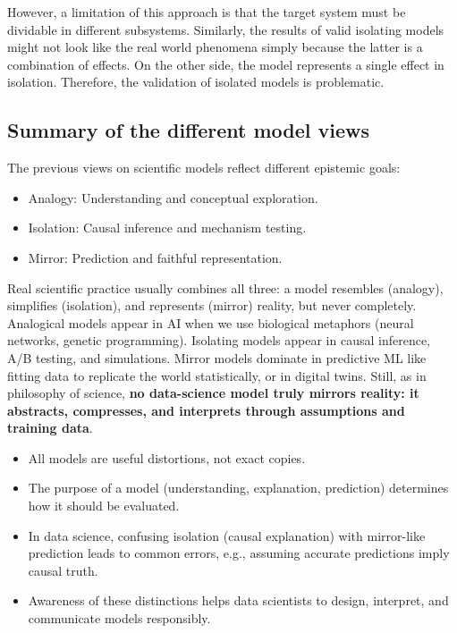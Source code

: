 \documentclass[
  12pt,
]{book}
\providecommand{\tightlist}{%
  \setlength{\itemsep}{0pt}\setlength{\parskip}{0pt}}
\begin{document}
However, a limitation of this approach is that the target system must be dividable in different subsystems. Similarly, the results of valid isolating models might not look like the real world phenomena simply because the latter is a combination of effects. On the other side, the model represents a single effect in isolation. Therefore, the validation of isolated models is problematic.

\subsection{Summary of the different model views}\label{summary-of-the-different-model-views}

The previous views on scientific models reflect different epistemic goals:

\begin{itemize}
\tightlist
\item
  Analogy: Understanding and conceptual exploration.
\item
  Isolation: Causal inference and mechanism testing.
\item
  Mirror: Prediction and faithful representation.
\end{itemize}

Real scientific practice usually combines all three: a model resembles (analogy), simplifies (isolation), and represents (mirror) reality, but never completely. Analogical models appear in AI when we use biological metaphors (neural networks, genetic programming). Isolating models appear in causal inference, A/B testing, and simulations. Mirror models dominate in predictive ML like fitting data to replicate the world statistically, or in digital twins. Still, as in philosophy of science, \textbf{no data-science model truly mirrors reality: it abstracts, compresses, and interprets through assumptions and training data}.

\begin{itemize}
\tightlist
\item
  All models are useful distortions, not exact copies.
\item
  The purpose of a model (understanding, explanation, prediction) determines how it should be evaluated.
\item
  In data science, confusing isolation (causal explanation) with mirror-like prediction leads to common errors, e.g., assuming accurate predictions imply causal truth.
\item
  Awareness of these distinctions helps data scientists to design, interpret, and communicate models responsibly.
\end{itemize}
\end{document}
